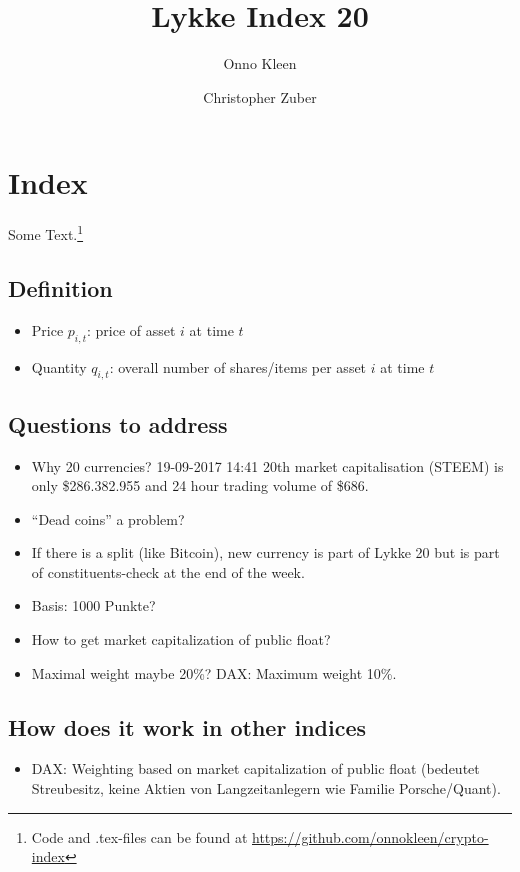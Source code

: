 \documentclass[11pt]{article}
\title{Lykke Index 20}
\author{Onno Kleen \and Christopher Zuber}
\begin{document}
\maketitle
\section{Index}

Some Text.\footnote{Code and .tex-files can be found at \href{https://github.com/onnokleen/crypto-index}{https://github.com/onnokleen/crypto-index}}

\subsection{Definition}

\begin{itemize}
  \item Price $p_{i,t}$: price of asset $i$ at time $t$
  \item Quantity $q_{i,t}$: overall number of shares/items per asset $i$ at time $t$
\end{itemize}
\subsection{Questions to address}
\begin{itemize}
  \item Why 20 currencies? 19-09-2017 14:41 20th market capitalisation (STEEM) is only \$286.382.955	and 24 hour trading volume of \$686.
  \item ``Dead coins'' a problem?
  \item If there is a split (like Bitcoin), new currency is part of Lykke 20 but is part of constituents-check at the end of the week.
  \item Basis: 1000 Punkte?
  \item How to get market capitalization of public float?
  \item Maximal weight maybe 20\%? DAX: Maximum weight 10\%.
\end{itemize}

\subsection{How does it work in other indices}

\begin{itemize}
  \item DAX: Weighting based on market capitalization of public float (bedeutet Streubesitz, keine Aktien von Langzeitanlegern  wie Familie Porsche/Quant).
\end{itemize}
\end{document}
